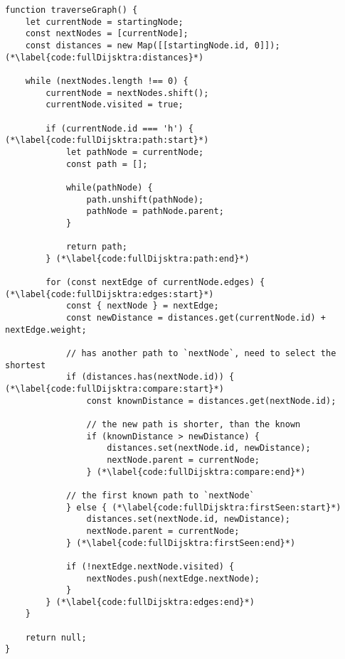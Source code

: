 \documentclass[../article.tex]{subfiles}
\begin{document}
\begin{figure*}
    \begin{ruledelement}
        \begin{lstlisting}[caption={Первый подход к поиску кратчайшего пути}, label={lst:fullDijsktra}]
function traverseGraph() {
    let currentNode = startingNode;
    const nextNodes = [currentNode];
    const distances = new Map([[startingNode.id, 0]]); (*\label{code:fullDijsktra:distances}*)

    while (nextNodes.length !== 0) {
        currentNode = nextNodes.shift();
        currentNode.visited = true;

        if (currentNode.id === 'h') { (*\label{code:fullDijsktra:path:start}*)
            let pathNode = currentNode;
            const path = [];

            while(pathNode) {
                path.unshift(pathNode);
                pathNode = pathNode.parent;
            }

            return path;
        } (*\label{code:fullDijsktra:path:end}*)

        for (const nextEdge of currentNode.edges) { (*\label{code:fullDijsktra:edges:start}*)
            const { nextNode } = nextEdge;
            const newDistance = distances.get(currentNode.id) + nextEdge.weight;

            // has another path to `nextNode`, need to select the shortest
            if (distances.has(nextNode.id)) { (*\label{code:fullDijsktra:compare:start}*)
                const knownDistance = distances.get(nextNode.id);

                // the new path is shorter, than the known
                if (knownDistance > newDistance) {
                    distances.set(nextNode.id, newDistance);
                    nextNode.parent = currentNode;
                } (*\label{code:fullDijsktra:compare:end}*)

            // the first known path to `nextNode`
            } else { (*\label{code:fullDijsktra:firstSeen:start}*)
                distances.set(nextNode.id, newDistance);
                nextNode.parent = currentNode;
            } (*\label{code:fullDijsktra:firstSeen:end}*)

            if (!nextEdge.nextNode.visited) {
                nextNodes.push(nextEdge.nextNode);
            }
        } (*\label{code:fullDijsktra:edges:end}*)
    }

    return null;
}
        \end{lstlisting}
    \end{ruledelement}

\end{figure*}
\end{document}
